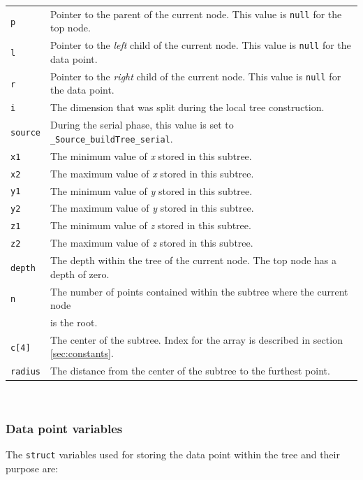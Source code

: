 \documentclass{article}
\begin{document}
\begin{tabular}{l l}
\texttt{p} & Pointer to the parent of the current node. This value is \texttt{null} for the top node. \\
\texttt{l} & Pointer to the \textit{left} child of the current node. This value is \texttt{null} for the data point. \\
\texttt{r} & Pointer to the \textit{right} child of the current node. This value is \texttt{null} for the data point. \\
\texttt{i} & The dimension that was split during the local tree construction. \\
\texttt{source} & During the serial phase, this value is set to \texttt{\_Source\_buildTree\_serial}. \\
\texttt{x1} & The minimum value of \textit{x} stored in this subtree. \\
\texttt{x2} & The maximum value of \textit{x} stored in this subtree. \\
\texttt{y1} & The minimum value of \textit{y} stored in this subtree. \\
\texttt{y2} & The maximum value of \textit{y} stored in this subtree. \\
\texttt{z1} & The minimum value of \textit{z} stored in this subtree. \\
\texttt{z2} & The maximum value of \textit{z} stored in this subtree. \\
\texttt{depth} & The depth within the tree of the current node. The top node has a depth of zero. \\
\texttt{n} & The number of points contained within the subtree where the current node \\
& is the root. \\
\texttt{c[4]} & The center of the subtree. Index for the array is described in section \ref{sec:constants}. \\
\texttt{radius} & The distance from the center of the subtree to the furthest point. \\
\end{tabular} \\


%
%

\subsubsection{Data point variables}

The \texttt{struct} variables used for storing the data point within the tree and their purpose are:
\end{document}
